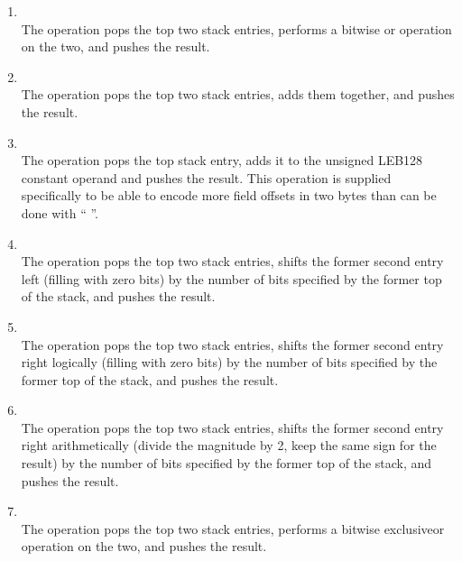 \begin{enumerate}[1]
\item  {} \\
The  operation pops the top two stack entries, performs
a bitwise or operation on the two, and pushes the result.

\item  {} \\
The  operation pops the top two stack entries,
adds them together, and pushes the result.

\item  {} \\
The  operation pops the top stack entry,
adds it to the unsigned LEB128 constant operand and pushes
the result.  This operation is supplied specifically to be
able to encode more field offsets in two bytes than can be
done with “ ”.

\item {} \\
The  operation pops the top two stack entries,
shifts the former second entry left (filling with zero bits)
by the number of bits specified by the former top of the stack,
and pushes the result.

\item {} \\
The  operation pops the top two stack entries,
shifts the former second entry right logically (filling with
zero bits) by the number of bits specified by the former top
of the stack, and pushes the result.

\item {} \\
The  operation pops the top two stack entries,
shifts the former second entry right arithmetically (divide
the magnitude by 2, keep the same sign for the result) by
the number of bits specified by the former top of the stack,
and pushes the result.

\item {} \\
The  operation pops the top two stack entries,
performs a bitwise exclusive\dash or operation on the two, and
pushes the result.

\end{enumerate}

